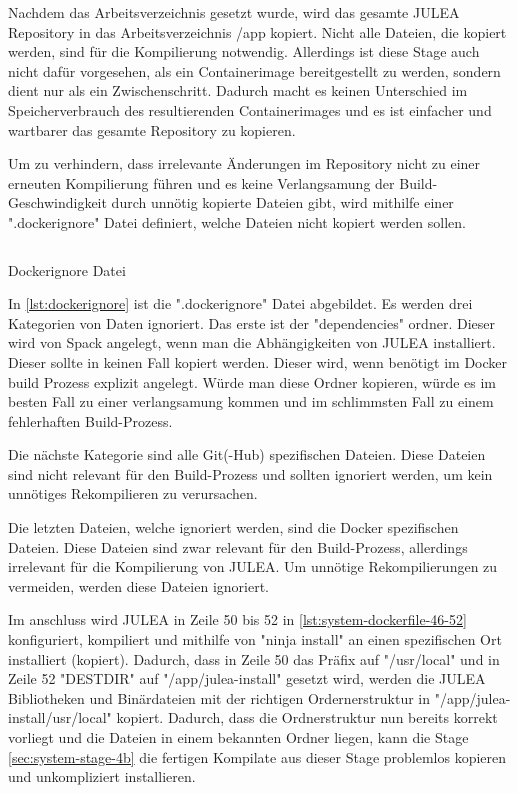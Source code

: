 Nachdem das Arbeitsverzeichnis gesetzt wurde, wird das gesamte JULEA Repository in das Arbeitsverzeichnis /app kopiert. Nicht alle Dateien, die kopiert werden, sind für die Kompilierung notwendig. Allerdings ist diese Stage auch nicht dafür vorgesehen, als ein Containerimage bereitgestellt zu werden, sondern dient nur als ein Zwischenschritt. Dadurch macht es keinen Unterschied im Speicherverbrauch des resultierenden Containerimages und es ist einfacher und wartbarer das gesamte Repository zu kopieren.

Um zu verhindern, dass irrelevante Änderungen im Repository nicht zu einer erneuten Kompilierung führen und es keine Verlangsamung der Build-Geschwindigkeit durch unnötig kopierte Dateien gibt, wird mithilfe einer ".dockerignore" Datei definiert, welche Dateien nicht kopiert werden sollen.

\begin{listing}[H]
    \inputminted{text}{./code-examples/.dockerignore}
    \caption{Dockerignore Datei}
    \label{lst:dockerignore}
\end{listing}

In \cref{lst:dockerignore} ist die ".dockerignore" Datei abgebildet. Es werden drei Kategorien von Daten ignoriert. Das erste ist der "dependencies" ordner. Dieser wird von Spack angelegt, wenn man die Abhängigkeiten von JULEA installiert. Dieser sollte in keinen Fall kopiert werden. Dieser wird, wenn benötigt im Docker build Prozess explizit angelegt. Würde man diese Ordner kopieren, würde es im besten Fall zu einer verlangsamung kommen und im schlimmsten Fall zu einem fehlerhaften Build-Prozess.

Die nächste Kategorie sind alle Git(-Hub) spezifischen Dateien. Diese Dateien sind nicht relevant für den Build-Prozess und sollten ignoriert werden, um kein unnötiges Rekompilieren zu verursachen.

Die letzten Dateien, welche ignoriert werden, sind die Docker spezifischen Dateien. Diese Dateien sind zwar relevant für den Build-Prozess, allerdings irrelevant für die Kompilierung von JULEA. Um unnötige Rekompilierungen zu vermeiden, werden diese Dateien ignoriert.

Im anschluss wird JULEA in Zeile 50 bis 52 in \cref{lst:system-dockerfile-46-52} konfiguriert, kompiliert und mithilfe von "ninja install" an einen spezifischen Ort installiert (kopiert). Dadurch, dass in Zeile 50 das Präfix auf "/usr/local" und in Zeile 52 "DESTDIR" auf "/app/julea-install" gesetzt wird, werden die JULEA Bibliotheken und Binärdateien mit der richtigen Ordernerstruktur in "/app/julea-install/usr/local" kopiert. Dadurch, dass die Ordnerstruktur nun bereits korrekt vorliegt und die Dateien in einem bekannten Ordner liegen, kann die Stage \cref{sec:system-stage-4b} die fertigen Kompilate aus dieser Stage problemlos kopieren und unkompliziert installieren.

